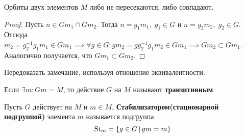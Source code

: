 \documentclass[../main.tex]{subfiles}
\begin{document}
\begin{remark}
  Орбиты двух элементов $M$ либо не пересекаются, либо совпадают.
\end{remark}
\begin{proof}
  Пусть $n \in Gm_1 \cap Gm_2$. Тогда $n = g_1m_1,\; g_1 \in G$ и $n = g_2m_2,\; g_2 \in G$. Отсюда $m_2 = g_2^{-1}g_1m_1 \in Gm_1 \implies \forall g \in G\colon gm_2 = gg_2^{-1}g_1m_2 \in Gm_1 \implies Gm_2 \subset Gm_1$. Аналогично получается, что $Gm_1 \subset Gm_2$.
\end{proof}
\begin{exercise}
  Передоказать замечание, используя отношение эквивалентности.
\end{exercise}

\begin{definition}
  Если $\exists m\colon Gm = M$, то действие $G$ на $M$ называют \textbf{транзитивным}.
\end{definition}

\begin{definition}
  Пусть $G$ действует на $M$ и $m \in M$. \textbf{Стабилизатором(стационарной подгруппой)} элемента $m$ называется подгруппа
  \begin{equation*}
    \operatorname{St}_m = \{g \in G \, | \, gm = m\}
  \end{equation*}
\end{definition}
\end{document}
